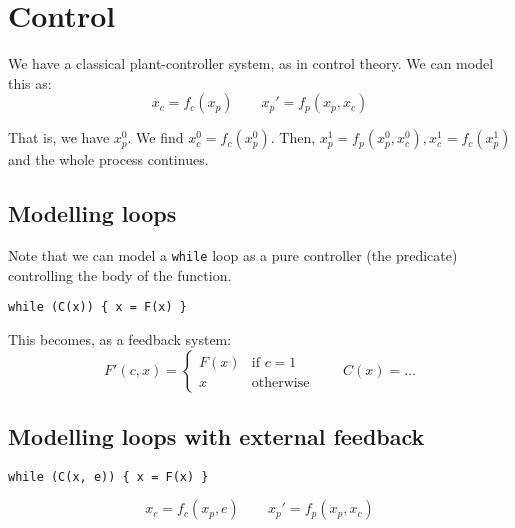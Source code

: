 \documentclass[11pt]{book}
\begin{document}
\chapter{Control}

We have a classical plant-controller system, as in control theory. We can
model this as:
$$ x_c = f_c(x_p) \qquad x_p' = f_p(x_p, x_c) $$

That is, we have $x_p^0$. We find $x_c^0 = f_c(x_p^0)$. Then, 
$x_p^1 = f_p(x_p^0, x_c^0),x_c^1 = f_c(x_p^1)$ and the whole process continues.

\section{Modelling loops} 
Note that we can model a \texttt{while} loop as a pure controller (the predicate)
controlling the body of the function.  
\begin{verbatim}
while (C(x)) { x = F(x) }
\end{verbatim}
This becomes, as a feedback system:
$$
F'(c, x) = \begin{cases} F(x) & \text{if $c = 1$} \\ x & \text{otherwise} \end{cases}
\qquad
C(x) = \dots
$$

\section{Modelling loops with external feedback} 
\begin{verbatim}
while (C(x, e)) { x = F(x) }
\end{verbatim}
$$ x_c = f_c(x_p, e) \qquad x_p' = f_p(x_p, x_c) $$
\end{document}
